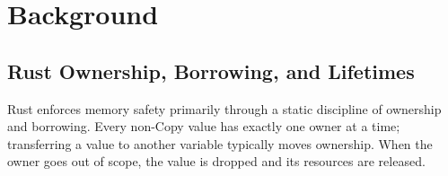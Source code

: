 \documentclass[sigconf]{acmart}
\begin{document}




\section{Background}
\label{sec:background}

\subsection{Rust Ownership, Borrowing, and Lifetimes}
\label{sec:background:rust}
Rust enforces memory safety primarily through a static discipline of ownership and borrowing. Every non-Copy value has exactly one owner at a time; transferring a value to another variable typically moves ownership. When the owner goes out of scope, the value is dropped and its resources are released.
\end{document}
